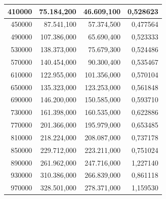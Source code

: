 \documentclass[a4paper, 12pt]{article}
\begin{document}
\begin{longtable}[c]{@{}rrrr@{}}
	\multicolumn{1}{|r|}{410000}                  & \multicolumn{1}{r|}{75.184,200}        & \multicolumn{1}{r|}{46.609,100}        & \multicolumn{1}{r|}{0,528623}       \\* \midrule
	\multicolumn{1}{|r|}{450000}                  & \multicolumn{1}{r|}{87.541,100}        & \multicolumn{1}{r|}{57.374,500}        & \multicolumn{1}{r|}{0,477564}       \\* \midrule
	\multicolumn{1}{|r|}{490000}                  & \multicolumn{1}{r|}{107.386,000}       & \multicolumn{1}{r|}{65.690,400}        & \multicolumn{1}{r|}{0,523333}       \\* \midrule
	\multicolumn{1}{|r|}{530000}                  & \multicolumn{1}{r|}{138.373,000}       & \multicolumn{1}{r|}{75.679,300}        & \multicolumn{1}{r|}{0,524486}       \\* \midrule
	\multicolumn{1}{|r|}{570000}                  & \multicolumn{1}{r|}{140.454,000}       & \multicolumn{1}{r|}{90.300,400}        & \multicolumn{1}{r|}{0,535467}       \\* \midrule
	\multicolumn{1}{|r|}{610000}                  & \multicolumn{1}{r|}{122.955,000}       & \multicolumn{1}{r|}{101.356,000}       & \multicolumn{1}{r|}{0,570104}       \\* \midrule
	\multicolumn{1}{|r|}{650000}                  & \multicolumn{1}{r|}{135.323,000}       & \multicolumn{1}{r|}{123.253,000}       & \multicolumn{1}{r|}{0,561848}       \\* \midrule
	\multicolumn{1}{|r|}{690000}                  & \multicolumn{1}{r|}{146.200,000}       & \multicolumn{1}{r|}{150.585,000}       & \multicolumn{1}{r|}{0,593710}       \\* \midrule
	\multicolumn{1}{|r|}{730000}                  & \multicolumn{1}{r|}{161.398,000}       & \multicolumn{1}{r|}{160.535,000}       & \multicolumn{1}{r|}{0,622886}       \\* \midrule
	\multicolumn{1}{|r|}{770000}                  & \multicolumn{1}{r|}{201.366,000}       & \multicolumn{1}{r|}{195.979,000}       & \multicolumn{1}{r|}{0,653485}       \\* \midrule
	\multicolumn{1}{|r|}{810000}                  & \multicolumn{1}{r|}{218.224,000}       & \multicolumn{1}{r|}{208.087,000}       & \multicolumn{1}{r|}{0,737178}       \\* \midrule
	\multicolumn{1}{|r|}{850000}                  & \multicolumn{1}{r|}{229.712,000}       & \multicolumn{1}{r|}{223.211,000}       & \multicolumn{1}{r|}{0,751024}       \\* \midrule
	\multicolumn{1}{|r|}{890000}                  & \multicolumn{1}{r|}{261.962,000}       & \multicolumn{1}{r|}{247.716,000}       & \multicolumn{1}{r|}{1,227140}       \\* \midrule
	\multicolumn{1}{|r|}{930000}                  & \multicolumn{1}{r|}{310.386,000}       & \multicolumn{1}{r|}{266.839,000}       & \multicolumn{1}{r|}{0,861118}       \\* \midrule
	\multicolumn{1}{|r|}{970000}                  & \multicolumn{1}{r|}{328.501,000}       & \multicolumn{1}{r|}{278.371,000}       & \multicolumn{1}{r|}{1,159530}       \\* \bottomrule
\end{longtable}
\end{document}
